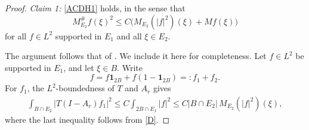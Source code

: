 \documentclass[12pt]{amsart}
\begin{document}
\begin{proof}
\textit{Claim 1:} \eqref{ACDH1} holds, in the sense that
\begin{equation*}
    M_{E_2}^{\#}f(\xi)^2 \le C \bigl(M_{E_2}(|f|^2)(\xi) + M f(\xi)\bigr)
\end{equation*}
for all $f\in L^2$ supported in $E_1$ and all $\xi \in E_2$.

The argument follows that of \cite[Subsection~3.2, Section~4]{ACDH}. We include it here for completeness. Let $f\in L^2$ be supported in $E_1$, and let $\xi \in B$. Write
\begin{equation*}
    f = f \mathbf{1}_{2B} + f ( 1- \mathbf{1}_{2B} ) =: f_1+f_2.
\end{equation*}
For $f_1$, the $L^2$-boundedness of $T$ and $A_r$ gives
\begin{align}\label{ACDHclaim1}
    \int_{B \cap E_2} |T(I-A_r)f_1|^2
    \le C \int_{2B \cap E_1} |f|^2
    \le C|B \cap E_2| \, M_{E_2}(|f|^2)(\xi),
\end{align}
where the last inequality follows from \eqref{D}.


\end{proof}
\end{document}
